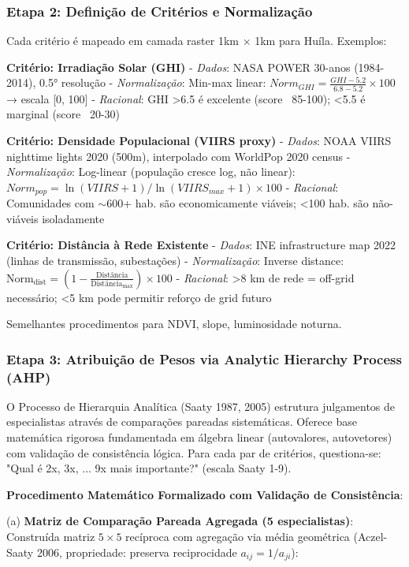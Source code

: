 \documentclass[12pt, a4paper]{article}
\begin{document}
\subsubsection{Etapa 2: Definição de Critérios e Normalização}

Cada critério é mapeado em camada raster 1km × 1km para Huíla. Exemplos:

\textbf{Critério: Irradiação Solar (GHI)}
- \textit{Dados}: NASA POWER 30-anos (1984-2014), 0.5° resolução
- \textit{Normalização}: Min-max linear: $Norm_{GHI} = \frac{GHI - 5.2}{6.8 - 5.2} \times 100$ → escala [0, 100]
- \textit{Racional}: GHI >6.5 é excelente (score ~85-100); <5.5 é marginal (score ~20-30)

\textbf{Critério: Densidade Populacional (VIIRS proxy)}
- \textit{Dados}: NOAA VIIRS nighttime lights 2020 (500m), interpolado com WorldPop 2020 census
- \textit{Normalização}: Log-linear (população cresce log, não linear): $Norm_{pop} = \ln(VIIRS + 1) / \ln(VIIRS_{max} + 1) \times 100$
- \textit{Racional}: Comunidades com $\sim$600+ hab. são economicamente viáveis; <100 hab. são não-viáveis isoladamente

\textbf{Critério: Distância à Rede Existente}
- \textit{Dados}: INE infrastructure map 2022 (linhas de transmissão, subestações)
- \textit{Normalização}: Inverse distance: $\text{Norm}_{\text{dist}} = (1 - \frac{\text{Distância}}{\text{Distância}_{\text{max}}}) \times 100$
- \textit{Racional}: >8 km de rede = off-grid necessário; <5 km pode permitir reforço de grid futuro

Semelhantes procedimentos para NDVI, slope, luminosidade noturna.

\subsubsection{Etapa 3: Atribuição de Pesos via Analytic Hierarchy Process (AHP)}

O Processo de Hierarquia Analítica (Saaty 1987, 2005) estrutura julgamentos de especialistas através de comparações pareadas sistemáticas.
Oferece base matemática rigorosa fundamentada em álgebra linear (autovalores, autovetores) com validação de consistência lógica.
Para cada par de critérios, questiona-se: "Qual é 2x, 3x, ... 9x mais importante?" (escala Saaty 1-9).

\textbf{Procedimento Matemático Formalizado com Validação de Consistência}:

(a) \textbf{Matriz de Comparação Pareada Agregada (5 especialistas)}: Construída matriz $5 \times 5$ recíproca com agregação via média geométrica (Aczel-Saaty 2006, propriedade: preserva reciprocidade $a_{ij} = 1/a_{ji}$):
\end{document}
